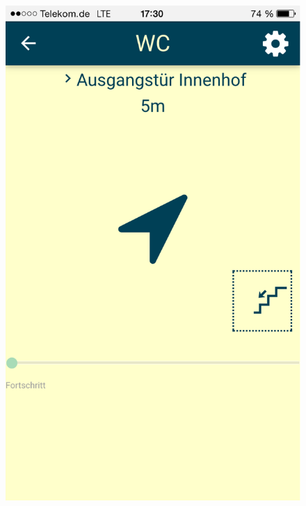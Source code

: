 \begin{figure}[ht]
\begin{minipage}[b]{.5\textwidth}
  \includegraphics[width=.8\linewidth]{img/navigation2.png}
  \label{img:navigation-second-draft}
\end{minipage}
\end{figure}

